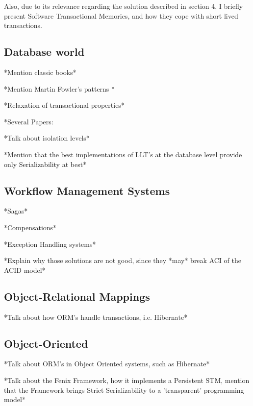 \documentclass{llncs}
\begin{document}
Also, due to its relevance regarding the
solution described in section 4, I briefly present Software
Transactional Memories, and how they cope with short lived transactions.

\subsection{Database world}

*Mention classic books*

*Mention Martin Fowler's patterns \cite{fowler2003patterns}*

*Relaxation of transactional properties*

*Several Papers: \cite{hagmann1991implementing} \cite{garcia1987sagas}
\cite{salem1989altruistic}

*Talk about isolation levels*

*Mention that the best implementations of LLT's at the database level
provide only Serializability at best*

\subsection{Workflow Management Systems}

*Sagas* \cite{garcia1987sagas}

\cite{798492}

*Compensations*

*Exception Handling systems*

*Explain why those solutions are not good, since they *may* break ACI
of the ACID model*

\subsection{Object-Relational Mappings}

*Talk about how ORM's handle transactions, i.e. Hibernate*

\subsection{Object-Oriented}

*Talk about ORM's in Object Oriented systems, such as Hibernate*

*Talk about the Fenix Framework, how it implements a Persistent STM,
mention that the Framework brings Strict Serializability to a
'transparent' programming model* \cite{fernandes2011strict} 
\cite{guerraoui2008correctness} \cite{cachopo2006versioned}
\end{document}
